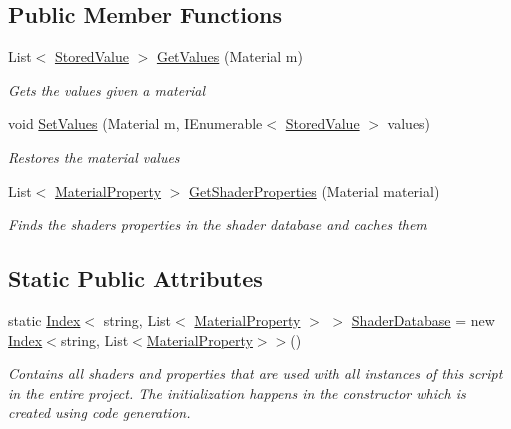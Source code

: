 \subsection*{Public Member Functions}
\begin{DoxyCompactItemize}
\item 
List$<$ \hyperlink{class_store_materials_1_1_stored_value}{Stored\+Value} $>$ \hyperlink{class_store_materials_a8d14e3842dcf9810c2ae522d86b4136a}{Get\+Values} (Material m)
\begin{DoxyCompactList}\small\item\em Gets the values given a material \end{DoxyCompactList}\item 
void \hyperlink{class_store_materials_addd21fe84003b8dc395f4f86eb1b2c52}{Set\+Values} (Material m, I\+Enumerable$<$ \hyperlink{class_store_materials_1_1_stored_value}{Stored\+Value} $>$ values)
\begin{DoxyCompactList}\small\item\em Restores the material values \end{DoxyCompactList}\item 
List$<$ \hyperlink{class_store_materials_1_1_material_property}{Material\+Property} $>$ \hyperlink{class_store_materials_a5d76730b8382318d4866d67c61a42f51}{Get\+Shader\+Properties} (Material material)
\begin{DoxyCompactList}\small\item\em Finds the shader\textquotesingle{}s properties in the shader database and caches them \end{DoxyCompactList}\end{DoxyCompactItemize}
\subsection*{Static Public Attributes}
\begin{DoxyCompactItemize}
\item 
static \hyperlink{class_index}{Index}$<$ string, List$<$ \hyperlink{class_store_materials_1_1_material_property}{Material\+Property} $>$ $>$ \hyperlink{class_store_materials_aeb8daf834861b7a2438a6e922588b7cb}{Shader\+Database} = new \hyperlink{class_index}{Index}$<$string, List$<$\hyperlink{class_store_materials_1_1_material_property}{Material\+Property}$>$$>$()
\begin{DoxyCompactList}\small\item\em Contains all shaders and properties that are used with all instances of this script in the entire project. The initialization happens in the constructor which is created using code generation. \end{DoxyCompactList}\end{DoxyCompactItemize}
